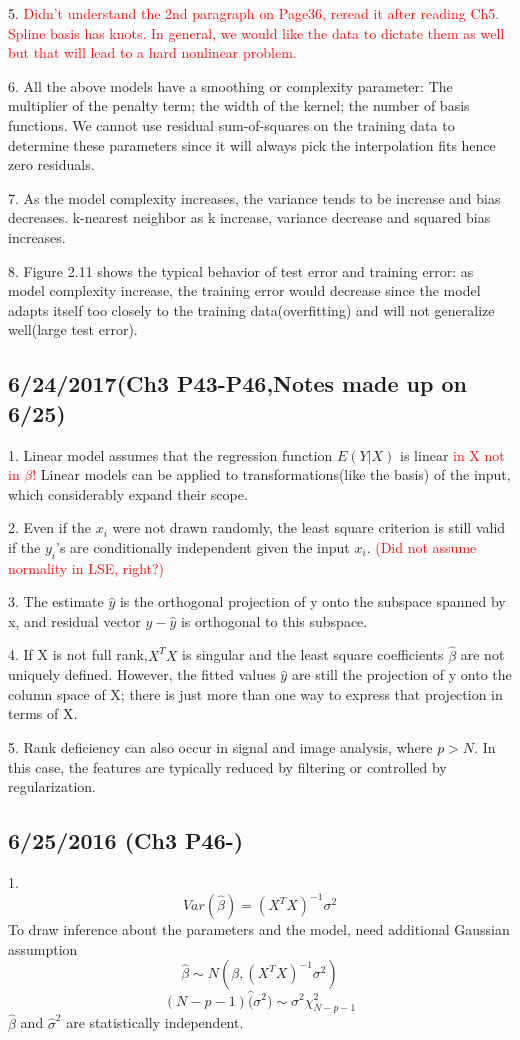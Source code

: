 \documentclass[a4paper, 12pt]{article}
\begin{document}
5.  \textcolor{red}{ 
Didn't understand the 2nd paragraph on Page36, reread it after reading Ch5. Spline basis has knots. In general, we would like the data to dictate them as well but that will lead to a hard nonlinear problem.
}

6. All the above models have a smoothing or complexity parameter: The multiplier of the penalty term; the width of the kernel; the number of basis functions. We cannot use residual sum-of-squares on the training data to determine these parameters since it will always pick the interpolation fits hence zero residuals.

7. As the model complexity increases, the variance tends to be increase and bias decreases. k-nearest neighbor as k increase, variance decrease and squared bias increases.

8. Figure 2.11 shows the typical behavior of test error and training error: as model complexity increase, the training error would decrease since the model adapts itself too closely to the training data(overfitting) and will not generalize well(large test error).

\subsection*{6/24/2017(Ch3 P43-P46,Notes made up on 6/25)}

1. Linear model assumes that the regression function $E(Y|X)$ is linear \textcolor{red}{  in X not in $\beta$! } Linear models can be applied to transformations(like the basis) of the input, which considerably expand their scope.

2. Even if the $x_i$ were not drawn randomly, the least square criterion is still valid if the $y_i$'s are conditionally independent given the input $x_i$.\textcolor{red}{ (Did not assume normality in LSE, right?) }

3. The estimate $\hat{y}$ is the orthogonal projection of y onto the subspace spanned by x, and residual vector $y-\hat{y}$ is orthogonal to this subspace.

4. If X is not full rank,$X^TX$ is singular and the least square coefficients $\hat{\beta}$ are not uniquely defined. However, the fitted values $\hat{y}$ are still the projection of y onto the column space of X; there is just more than one way to express that projection in terms of X.

5. Rank deficiency can also occur in signal and image analysis, where $p>N$. In this case, the features are typically reduced by filtering or controlled by regularization.

\subsection*{6/25/2016 (Ch3 P46-)}

1.$$Var(\hat{\beta})=(X^TX)^{-1}\sigma^2$$
To  draw inference about the parameters and the  model, need additional Gaussian assumption
$$\hat{\beta} \sim N(\beta,(X^TX)^{-1}\sigma^2 )$$
$$(N-p-1)\hat(\sigma^2) \sim \sigma^2\chi^2_{N-p-1}$$
$\hat{\beta}$ and $\hat{\sigma}^2$ are statistically independent.
\end{document}
